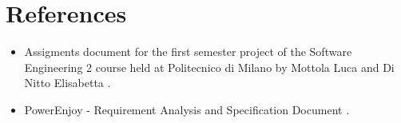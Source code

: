 \section{References}

\begin{itemize}
	\item Assigments document for the first semester project of the Software Engineering 2 course held at Politecnico di Milano by Mottola Luca and Di Nitto Elisabetta \cite{assignments}.
	\item PowerEnjoy - Requirement Analysis and Specification Document \cite{rasd}.
\end{itemize}
